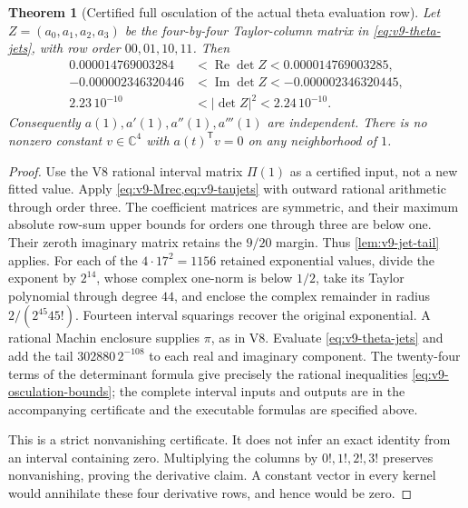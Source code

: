 \documentclass[11pt]{article}
\newtheorem{theorem}{Theorem}[section]
\theoremstyle{definition}
\theoremstyle{remark}
\newcommand{\C}{\mathbb C}
\begin{document}
\begin{theorem}[Certified full osculation of the actual theta evaluation row]
\label{thm:v9-osculation}
Let $Z=(a_0,a_1,a_2,a_3)$ be the four-by-four Taylor-column matrix in
\cref{eq:v9-theta-jets}, with row order $00,01,10,11$. Then
\begin{equation}
 \boxed{
 \begin{aligned}
 0.000014769003284&<\operatorname{Re}\det Z<0.000014769003285,\\
 -0.000002346320446&<\operatorname{Im}\det Z<-0.000002346320445,\\
 2.23\,10^{-10}&<|\det Z|^2<2.24\,10^{-10}.
 \end{aligned}}
 \label{eq:v9-osculation-bounds}
\end{equation}
Consequently $a(1),a'(1),a''(1),a'''(1)$ are independent. There is no
nonzero constant $v\in\C^4$ with $a(t)^{\mathsf T}v=0$ on any
neighborhood of $1$.
\end{theorem}
\begin{proof}
Use the V8 rational interval matrix $\Pi(1)$ as a certified input, not a
new fitted value. Apply \cref{eq:v9-Mrec,eq:v9-taujets} with outward
rational arithmetic through order three. The coefficient matrices are
symmetric, and their maximum absolute row-sum upper bounds for orders
one through three are below one. Their zeroth imaginary matrix retains
the $9/20$ margin. Thus \cref{lem:v9-jet-tail} applies.
For each of the $4\cdot17^2=1156$ retained exponential values, divide the
exponent by $2^{14}$, whose complex one-norm is below $1/2$, take its Taylor
polynomial through degree $44$, and enclose the complex remainder in radius
$2/(2^{45}45!)$. Fourteen interval squarings recover the original
exponential. A rational Machin enclosure supplies $\pi$, as in V8.
Evaluate \cref{eq:v9-theta-jets} and add the tail
$302880\,2^{-108}$ to each real and imaginary component. The twenty-four
terms of the determinant formula give precisely the rational inequalities
\cref{eq:v9-osculation-bounds}; the complete interval inputs and outputs are
in the accompanying certificate and the executable formulas are specified
above.

This is a strict nonvanishing certificate. It does not infer an exact
identity from an interval containing zero. Multiplying the columns by
$0!,1!,2!,3!$ preserves nonvanishing, proving the derivative claim.
A constant vector in every kernel would annihilate these four derivative
rows, and hence would be zero.
\end{proof}
\end{document}
